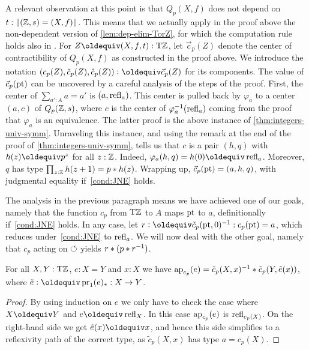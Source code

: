 \documentclass[a4paper,12pt]{amsart}
\begin{document}
A relevant observation at this point is that $Q_p(X,f)$ does not depend on
$t:\lVert(\mathbb{Z},s)=(X,f)\rVert$.
This means that we actually apply in the proof above the non-dependent version
of \cref{lem:dep-elim-TorZ}, for which the computation rule holds also in \UniMath{}.
For $Z \jdeq (X,f,t) : \TorZ$, let $\vec{c}_p(Z)$ denote the center of contractibility
of $Q_p(X,f)$ as constructed in the proof above.
  We introduce the notation $(c_p(Z),\tilde{c}_p(Z),\hat{c}_p(Z))\defeq\vec{c}_p(Z)$ for its components.
  The value of $\vec{c}_p({\mathord{\mathrm{pt}}})$ can be uncovered by a careful analysis of the steps of the proof.
First, the center of $\sum_{a':A} a=a'$ is $(a,\mathop{{\mathrm{refl}}_{a}})$.
This center is pulled back by $\varphi_{a}$ to a center
$(a,c)$ of $Q_p(\mathbb{Z},s)$, where $c$ is the center of
$\varphi_{a}^{-1}(\mathop{{\mathrm{refl}}_{a}})$ coming from the proof
that $\varphi_{a}$ is an equivalence. The latter proof
is the above instance of \cref{thm:integers-univ-symm}.
Unraveling this instance, and using the remark at the
end of the proof of \cref{thm:integers-univ-symm},
tells us that $c$ is a pair $(h,q)$ with $h(z)\jdeq p^z$
for all $z:\mathbb{Z}$. Indeed, $\varphi_{a}(h,q) = h(0) \jdeq \refl{a}$.
Moreover, $q$ has type $\prod_{z:\mathbb{Z}} h(z+1)=p* h(z)$.
Wrapping up, $\vec c_p({\mathord{\mathrm{pt}}}) = (a,h,q)$,
with judgmental equality if~\cref{cond:JNE} holds.

The analysis in the previous paragraph
means we have achieved one of our goals,
namely that the function $c_p$ from ${\mathrm{T}\mathbb{Z}}$ to $A$
maps ${\mathord{\mathrm{pt}}}$ to $a$, definitionally if~\cref{cond:JNE} holds.
In any case, let $r \defeq \tilde c_p(\pt,0)^{-1} : c_p(\pt) = a$,
which reduces under~\cref{cond:JNE} to $\mathop{{\mathrm{refl}}_{a}}$.
We will now deal with the other goal,
namely that $c_p$ acting on ${\circlearrowleft}$ yields $r * (p * r^{-1})$.

\begin{lemma}\label{lem:ap-c-tilde-c}
For all $X,Y:{\mathrm{T}\mathbb{Z}}$, $e: X=Y$ and $x:X$ we have
$\mathop{{\mathrm{ap}}_{c_p}}(e) = \tilde c_p(X,x)^{-1}* \tilde c_p(Y,\tilde {e}(x))$,
where $\ptoe{e}\defeq \pr_1(e)_* : X\to Y$.
\end{lemma}
\begin{proof}
By using induction on $e$ we only have to check the case where
$X\jdeq Y$ and $e\jdeq\refl{X}$. In this case $\mathop{{\mathrm{ap}}_{c_p}}(e)$ is
$\mathop{{\mathrm{refl}}_{c_p(X)}}$. On the right-hand side we get $\ptoe{e}(x)\jdeq x$,
and hence this side simplifies to a reflexivity path of
the correct type, as $\tilde c_p(X,x)$ has type $a=c_p(X)$.
\end{proof}
\end{document}
